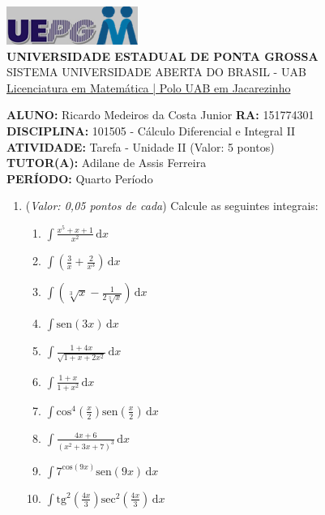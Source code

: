 \documentclass[a4paper, 12pt]{article}
\begin{document}
\begin{flushleft}\includegraphics{logo}\\
\textbf{UNIVERSIDADE ESTADUAL DE PONTA GROSSA} \\
SISTEMA UNIVERSIDADE ABERTA DO BRASIL - UAB \\
\underline{Licenciatura em Matemática | Polo UAB em Jacarezinho}\end{flushleft} 
\textbf{ALUNO:} Ricardo Medeiros da Costa Junior   \textbf{RA:} 151774301 \\
\textbf{DISCIPLINA:} 101505 - Cálculo Diferencial e Integral II \\
\textbf{ATIVIDADE:} Tarefa - Unidade II (Valor: 5 pontos) \\
\textbf{TUTOR(A):} Adilane de Assis Ferreira \\
\textbf{PERÍODO:} Quarto Período \\
\begin{enumerate}
\item ({\it Valor: 0,05 pontos de cada}) Calcule as seguintes integrais:
  \begin{enumerate}
  \item $ \int \! \frac{x^{5}+x+1}{x^{2}} \, \mathrm{d}x $
  \item $ \int \! \left ( \frac{3}{x} + \frac{2}{x^{3}} \right ) \, \mathrm{d}x $
  \item $ \int \! \left ( \sqrt[3]{x} - \frac{1}{2 \sqrt[3]{x}} \right ) \, \mathrm{d}x $
  \item $ \int \! \mathrm{sen}(3x) \, \mathrm{d}x $
  \item $ \int \! \frac{1+4x}{\sqrt{1+x+2x^{2}}} \, \mathrm{d}x $
  \item $ \int \! \frac{1+x}{1+x^{2}} \, \mathrm{d}x $
  \item $ \int \! \mathrm{cos}^{4} \left( \frac{x}{2} \right) \mathrm{sen} \left(\frac{x}{2} \right) \, \mathrm{d}x $
  \item $ \int \! \frac{4x+6}{(x^{2}+3x+7)^{3}} \, \mathrm{d}x $
  \item $ \int \! 7^{\mathrm{cos}(9x)} \mathrm{sen}(9x) \, \mathrm{d}x $
  \item $ \int \! \mathrm{tg}^{2} \left( \frac{4x}{3} \right) \mathrm{sec}^{2} \left(\frac{4x}{3} \right) \, \mathrm{d}x $    
  \end{enumerate}
\end{enumerate}
\end{document}
